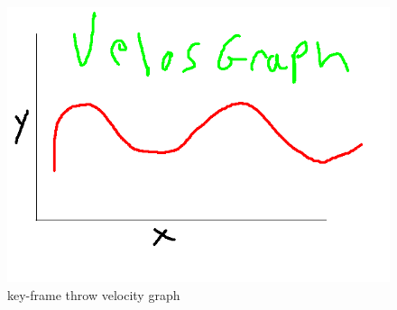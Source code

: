 \begin{figure}[t]
  \centering
\includegraphics[width=1.0\columnwidth]{./pix/keyframeVelosGraph.png}
  \caption{key-frame throw velocity graph}
  \label{fig:keyframe-graph}
\end{figure}